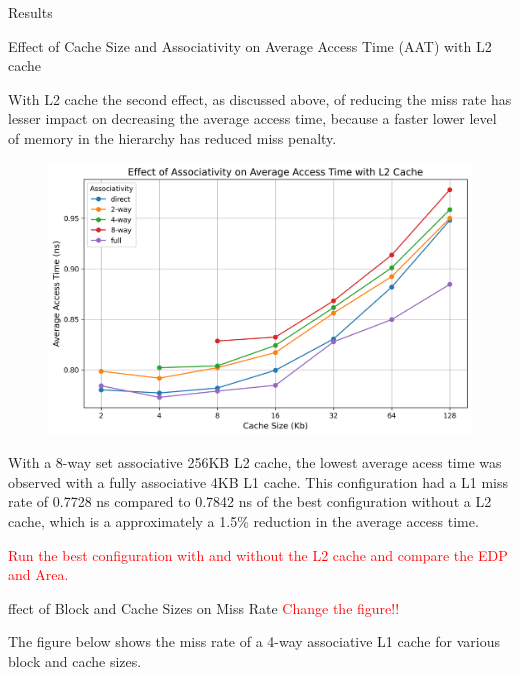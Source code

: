 \begin{section}{Results}
    \newpage


    \begin{subsection}{Effect of Cache Size and Associativity on Average Access Time (AAT) with L2 cache}
    
        With L2 cache the second effect, as discussed above, of reducing the miss rate has lesser impact on decreasing the average access time, because a faster lower level of memory in the hierarchy has reduced miss penalty.
        
        \begin{figure}[h]
            \includegraphics[width=\textwidth]{figures/fig3/fig3.png}
            \centering
            \label{fig:fig3}
        \end{figure}

        With a 8-way set associative 256KB L2 cache, the lowest average acess time was observed with a fully associative 4KB L1 cache. This configuration had a L1 miss rate of 0.7728 ns compared to 0.7842 ns of the best configuration without a L2 cache, which is a approximately a 1.5\% reduction in the average access time.

        \textcolor{red}{Run the best configuration with and without the L2 cache and compare the EDP and Area.}
        
    
    \end{subsection}

    \newpage
    \begin{subsection}{ffect of Block and Cache Sizes on Miss Rate \textcolor{red}{Change the figure!!}}

    The figure below shows the miss rate of a 4-way associative L1 cache for various block and cache sizes.


\end{subsection}
\end{section}
